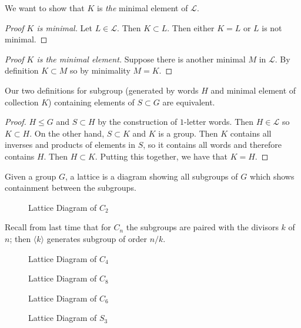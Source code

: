 We want to show that $K$ is \emph{the} minimal element of $\mathcal{L}$.

\begin{proof}[Proof $K$ is minimal]
Let $L \in \mathcal{L}$. Then $K \subset L$. Then either $K = L$ or $L$ is not minimal.
\end{proof}

\begin{proof}[Proof $K$ is \emph{the} minimal element]
Suppose there is another minimal $M$ in $\mathcal{L}$. By definition $K \subset M$ so by minimality $M = K$.
\end{proof}

\begin{proposition}
Our two definitions for subgroup (generated by words $H$ and minimal element of collection $K$) containing elements of $S \subset G$ are equivalent.
\end{proposition}

\begin{proof}
$H \leq G$ and $S \subset H$ by the construction of $1$-letter words. Then $H \in \mathcal{L}$ so $K \subset H$. On the other hand, $S \subset K$ and $K$ is a group. Then $K$ contains all inverses and products of elements in $S$, so it contains all words and therefore contains $H$. Then $H \subset K$. Putting this together, we have that $K = H$.
\end{proof}

\begin{definition}[Lattice]
Given a group $G$, a lattice is a diagram showing all subgroups of $G$ which shows containment between the subgroups.
\end{definition}

\begin{figure}[h]
	\caption{Lattice Diagram of $C_2$}
\end{figure}

Recall from last time that for $C_n$ the subgroups are paired with the divisors $k$ of $n$; then $\langle k \rangle$ generates subgroup of order $n / k$.

\begin{figure}[ht]
	\caption{Lattice Diagram of $C_4$}
\end{figure}

\begin{figure}[ht]
	\caption{Lattice Diagram of $C_8$}
\end{figure}

\begin{figure}[ht]
	\caption{Lattice Diagram of $C_6$}
\end{figure}

\begin{figure}[ht]
	\caption{Lattice Diagram of $S_3$}
\end{figure}